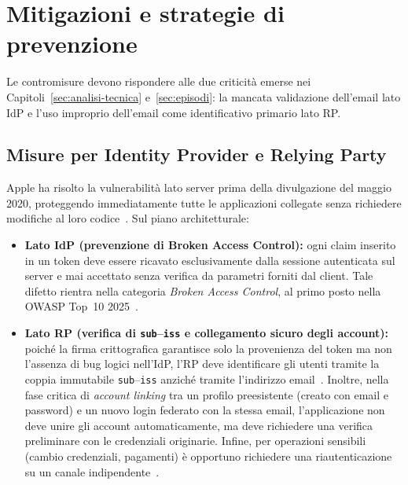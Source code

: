\section{Mitigazioni e strategie di prevenzione}
\label{sec:mitigazioni}

Le contromisure devono rispondere alle due criticità emerse nei Capitoli~\ref{sec:analisi-tecnica} e~\ref{sec:episodi}: la mancata validazione dell'email lato IdP e l'uso improprio dell'email come identificativo primario lato RP.

\subsection{Misure per Identity Provider e Relying Party}
Apple ha risolto la vulnerabilità lato server prima della divulgazione del maggio 2020, proteggendo immediatamente tutte le applicazioni collegate senza richiedere modifiche al loro codice~\cite{jain-apple-2020,goodin2020,infoq2020}. Sul piano architetturale:
\begin{itemize}
    \item \textbf{Lato IdP (prevenzione di Broken Access Control):} ogni claim inserito in un token deve essere ricavato esclusivamente dalla sessione autenticata sul server e mai accettato senza verifica da parametri forniti dal client. Tale difetto rientra nella categoria \emph{Broken Access Control}, al primo posto nella OWASP Top~10 2025~\cite{owasp-top10-a01}.
    \item \textbf{Lato RP (verifica di \texttt{sub}--\texttt{iss} e collegamento sicuro degli account):} poiché la firma crittografica garantisce solo la provenienza del token ma non l'assenza di bug logici nell'IdP, l'RP deve identificare gli utenti tramite la coppia immutabile \texttt{sub}--\texttt{iss} anziché tramite l'indirizzo email~\cite{openid-connect-core,nist800-63c-4-fed}. Inoltre, nella fase critica di \emph{account linking} tra un profilo preesistente (creato con email e password) e un nuovo login federato con la stessa email, l'applicazione non deve unire gli account automaticamente, ma deve richiedere una verifica preliminare con le credenziali originarie. Infine, per operazioni sensibili (cambio credenziali, pagamenti) è opportuno richiedere una riautenticazione su un canale indipendente~\cite{owasp-auth-cheatsheet}.
\end{itemize}

